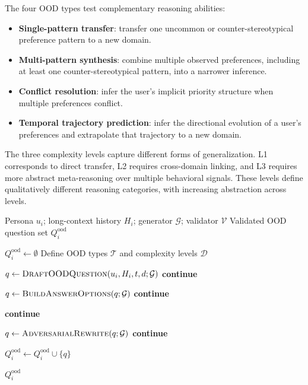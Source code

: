 \documentclass{article}
\begin{document}
The four OOD types test complementary reasoning abilities:
\begin{itemize}
    \item \textbf{Single-pattern transfer}: transfer one uncommon or counter-stereotypical preference pattern to a new domain.
    \item \textbf{Multi-pattern synthesis}: combine multiple observed preferences, including at least one counter-stereotypical pattern, into a narrower inference.
    \item \textbf{Conflict resolution}: infer the user's implicit priority structure when multiple preferences conflict.
    \item \textbf{Temporal trajectory prediction}: infer the directional evolution of a user's preferences and extrapolate that trajectory to a new domain.
\end{itemize}

The three complexity levels capture different forms of generalization. L1 corresponds to direct transfer, L2 requires cross-domain linking, and L3 requires more abstract meta-reasoning over multiple behavioral signals. These levels define qualitatively different reasoning categories, with increasing abstraction across levels.

\begin{algorithm}[t]
\caption{OOD Question Generation with Dual-Blind Filtering}
\label{alg:ood_generation}
\begin{algorithmic}[1]
\Require Persona $u_i$; long-context history $H_i$; generator $\mathcal{G}$; validator $\mathcal{V}$
\Ensure Validated OOD question set $Q_i^{\mathrm{ood}}$

\State $Q_i^{\mathrm{ood}} \gets \emptyset$
\State Define OOD types $\mathcal{T}$ and complexity levels $\mathcal{D}$

            \State $q \gets \textsc{DraftOODQuestion}(u_i,H_i,t,d;\mathcal{G})$
                \State \textbf{continue}
            \EndIf

            \State $q \gets \textsc{BuildAnswerOptions}(q;\mathcal{G})$
                \State \textbf{continue}
            \EndIf

                \State \textbf{continue}
            \EndIf

                \State $q \gets \textsc{AdversarialRewrite}(q;\mathcal{G})$
                    \State \textbf{continue}
                \EndIf
            \EndIf

            \State $Q_i^{\mathrm{ood}} \gets Q_i^{\mathrm{ood}} \cup \{q\}$
        \EndFor
    \EndFor
\EndFor

\State \Return $Q_i^{\mathrm{ood}}$
\end{algorithmic}
\end{algorithm}
\end{document}
